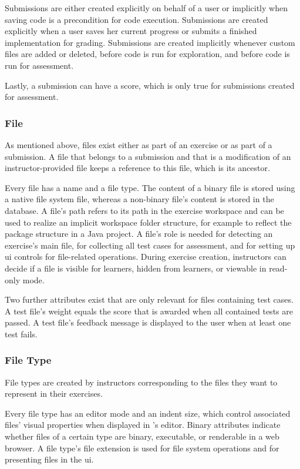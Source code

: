 Submissions are either created explicitly on behalf of a user or implicitly when saving code is a precondition for code execution. Submissions are created explicitly when a user saves her current progress or submits a finished implementation for grading. Submissions are created implicitly whenever custom files are added or deleted, before code is run for exploration, and before code is run for assessment.

Lastly, a submission can have a score, which is only true for submissions created for assessment.

\subsubsection{File}

As mentioned above, files exist either as part of an exercise or as part of a submission. A file that belongs to a submission and that is a modification of an instructor-provided file keeps a reference to this file, which is its ancestor.

Every file has a name and a file type. The content of a binary file is stored using a native file system file, whereas a non-binary file's content is stored in the database. A file's path refers to its path in the exercise workspace and can be used to realize an implicit workspace folder structure, for example to reflect the package structure in a Java project. A file's role is needed for detecting an exercise's main file, for collecting all test cases for assessment, and for setting up \gls{ui} controls for file-related operations. During exercise creation, instructors can decide if a file is visible for learners, hidden from learners, or viewable in read-only mode.

Two further attributes exist that are only relevant for files containing test cases. A test file's weight equals the score that is awarded when all contained tests are passed. A test file's feedback message is displayed to the user when at least one test fails.

\subsubsection{File Type}

File types are created by instructors corresponding to the files they want to represent in their exercises.

Every file type has an editor mode and an indent size, which control associated files' visual properties when displayed in \tool's editor. Binary attributes indicate whether files of a certain type are binary, executable, or renderable in a web browser. A file type's file extension is used for file system operations and for presenting files in the \gls{ui}.

